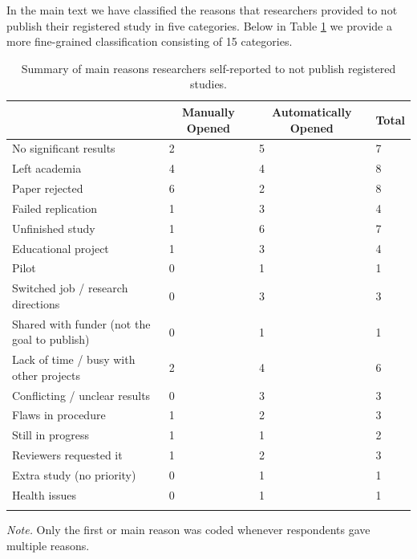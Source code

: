 \documentclass[
  ,jou, a4paper,floatsintext]{apa6}
\begin{document}
In the main text we have classified the reasons that researchers provided to not publish their registered study in five categories. Below in Table \ref{tab:reasons-non-publish} we provide a more fine-grained classification consisting of 15 categories.

\begin{table}[tbp]

\begin{center}
\begin{threeparttable}

\caption{\label{tab:reasons-non-publish}Summary of main reasons researchers self-reported to not publish registered studies.}

\begin{tabular}{llll}
\toprule
 & \multicolumn{1}{c}{Manually Opened} & \multicolumn{1}{c}{Automatically Opened} & \multicolumn{1}{c}{Total}\\
\midrule
No significant results & 2 & 5 & 7\\
Left academia & 4 & 4 & 8\\
Paper rejected & 6 & 2 & 8\\
Failed replication & 1 & 3 & 4\\
Unfinished study & 1 & 6 & 7\\
Educational project & 1 & 3 & 4\\
Pilot & 0 & 1 & 1\\
Switched job / research directions & 0 & 3 & 3\\
Shared with funder (not the goal to publish) & 0 & 1 & 1\\
Lack of time / busy with other projects & 2 & 4 & 6\\
Conflicting / unclear results & 0 & 3 & 3\\
Flaws in procedure & 1 & 2 & 3\\
Still in progress & 1 & 1 & 2\\
Reviewers requested it & 1 & 2 & 3\\
Extra study (no priority) & 0 & 1 & 1\\
Health issues & 0 & 1 & 1\\
\bottomrule
\addlinespace
\end{tabular}

\begin{tablenotes}[para]
\normalsize{\textit{Note.} Only the first or main reason was coded whenever respondents gave multiple reasons.}
\end{tablenotes}

\end{threeparttable}
\end{center}

\end{table}
\end{document}
